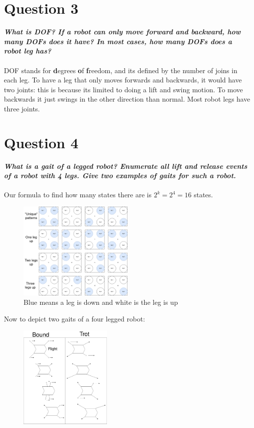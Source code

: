 \documentclass{article}
\newcommand\tab[1][1cm]{\hspace*{#1}}
\begin{document}
\section*{Question 3}
\textbf{\textit{
    \tab What is DOF? If a robot can only move forward and backward, 
    how many DOFs does it have? In most cases, how many DOFs does a robot leg has?
}} \\ \\
DOF stands for \textbf{d}egrees \textbf{o}f \textbf{f}reedom, and its defined by the
number of joins in each leg. To have a leg that only moves forwards and backwards,
it would have two joints: this is because its limited to doing a lift and swing motion.
To move backwards it just swings in the other direction than normal. Most robot legs
have three joints.
\newpage
\section*{Question 4}
\textbf{\textit{
    \tab What is a gait of a legged robot? Enumerate all lift and release 
    events of a robot with 4 legs. Give two examples of gaits for such a robot.
}} \\ \\
Our formula to find how many states there are is $2^k = 2^4 = 16$ states.
\begin{figure}[ht]
    \centering
    \includegraphics[width=0.5\textwidth]{img/gait.png}
    \caption{Blue means a leg is down and white is the leg is up}
\end{figure}

Now to depict two gaits of a four legged robot:
\begin{figure}[ht]
    \centering
    \includegraphics[width=0.4\textwidth]{img/gait-walk.png}
\end{figure}
\newpage
\end{document}
